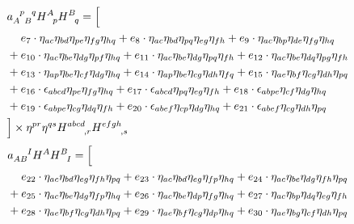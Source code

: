 \begin{itemize}
{\begin{minipage}[t]{\linewidth}
\begin{equation}
  \begin{aligned}
    & a_{A\hphantom{p}B}^{\hphantom Ap\hphantom Bq} H^A_{\hphantom Ap} H^B_{\hphantom Bq} = \Big\lbrack \\
    & \hphantom{{}+{}} e_{7} \cdot \eta_{a c} \eta_{b d} \eta_{p e} \eta_{f g} \eta_{h q} + e_{8} \cdot \eta_{a c} \eta_{b d} \eta_{p q} \eta_{e g} \eta_{f h} + e_{9} \cdot \eta_{a c} \eta_{b p} \eta_{d e} \eta_{f g} \eta_{h q} \\
    & + e_{10} \cdot \eta_{a c} \eta_{b e} \eta_{d g} \eta_{p f} \eta_{h q} + e_{11} \cdot \eta_{a c} \eta_{b e} \eta_{d g} \eta_{p q} \eta_{f h} + e_{12} \cdot \eta_{a c} \eta_{b e} \eta_{d q} \eta_{p g} \eta_{f h} \\
    & + e_{13} \cdot \eta_{a p} \eta_{b e} \eta_{c f} \eta_{d g} \eta_{h q} + e_{14} \cdot \eta_{a p} \eta_{b e} \eta_{c g} \eta_{d h} \eta_{f q} + e_{15} \cdot \eta_{a e} \eta_{b f} \eta_{c g} \eta_{d h} \eta_{p q} \\
    & + e_{16} \cdot \epsilon_{a b c d} \eta_{p e} \eta_{f g} \eta_{h q} + e_{17} \cdot \epsilon_{a b c d} \eta_{p q} \eta_{e g} \eta_{f h} + e_{18} \cdot \epsilon_{a b p e} \eta_{c f} \eta_{d g} \eta_{h q} \\
    & + e_{19} \cdot \epsilon_{a b p e} \eta_{c g} \eta_{d q} \eta_{f h} + e_{20} \cdot \epsilon_{a b e f} \eta_{c p} \eta_{d g} \eta_{h q} + e_{21} \cdot \epsilon_{a b e f} \eta_{c g} \eta_{d h} \eta_{p q} \\
    & \Big\rbrack \times \eta^{pr} \eta^{qs} H^{abcd}_{\hphantom{abcd},r} H^{efgh}_{\hphantom{efgh},s}
  \end{aligned}
\end{equation}
\begin{equation}\label{ansatz_ABI}
  \begin{aligned}
    & a_{AB}^{\hphantom{AB}I} H^A H^B_{\hphantom BI} = \Big\lbrack \\
    & \hphantom{{}+{}} e_{22} \cdot \eta_{a c} \eta_{b d} \eta_{e g} \eta_{f h} \eta_{p q} + e_{23} \cdot \eta_{a c} \eta_{b d} \eta_{e g} \eta_{f p} \eta_{h q} + e_{24} \cdot \eta_{a c} \eta_{b e} \eta_{d g} \eta_{f h} \eta_{p q} \\
    & + e_{25} \cdot \eta_{a c} \eta_{b e} \eta_{d g} \eta_{f p} \eta_{h q} + e_{26} \cdot \eta_{a c} \eta_{b e} \eta_{d p} \eta_{f g} \eta_{h q} + e_{27} \cdot \eta_{a c} \eta_{b p} \eta_{d q} \eta_{e g} \eta_{f h} \\
    & + e_{28} \cdot \eta_{a e} \eta_{b f} \eta_{c g} \eta_{d h} \eta_{p q} + e_{29} \cdot \eta_{a e} \eta_{b f} \eta_{c g} \eta_{d p} \eta_{h q} + e_{30} \cdot \eta_{a e} \eta_{b g} \eta_{c f} \eta_{d h} \eta_{p q} \\

\end{aligned}
\end{equation}
\end{minipage}}
\end{itemize}
